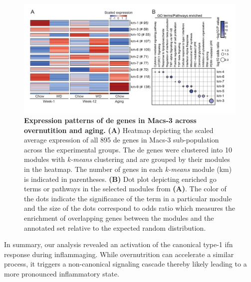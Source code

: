 \begin{figure}[t]
\centering
\includegraphics[width=\linewidth]{Chapter4/Fig/F2-11-02.png}
\caption[Expression patterns of  genes in Macs-3 across overnutition and aging]{\textbf{Expression patterns of \gls{de} genes in Macs-3 across overnutition and aging.} \textbf{(A)} Heatmap depicting the scaled average expression of all 895 \gls{de} genes in Macs-3 sub-population across the experimental groups. The \gls{de} genes were clustered into 10 modules with \textit{k-means} clustering and are grouped by their modules in the heatmap. The number of genes in each \textit{k-means} module (km) is indicated in parentheses. \textbf{(B)} Dot plot depicting enriched \gls{go} terms or pathways in the selected modules from \textbf{(A)}. The color of the dots indicate the significance of the term in a particular module and the size of the dots correspond to odds ratio which measures the enrichment of overlapping genes between the modules and the annotated set relative to the expected random distribution.}
\label{fig:chp2_scrna_macrophages_macs3_clust}
\end{figure}

\par In summary, our analysis revealed an activation of the canonical type-1 \gls{ifn} response during inflammaging. While overnutrition can accelerate a similar process, it triggers a non-canonical signaling cascade thereby likely leading to a more pronounced inflammatory state.


\clearpage

